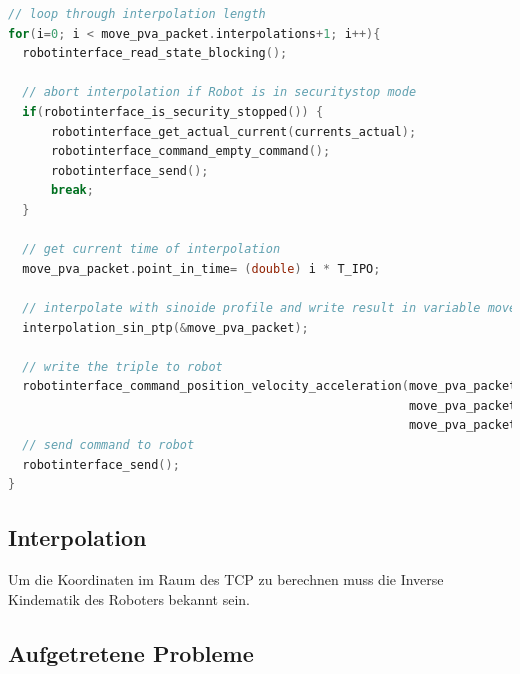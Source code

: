 \begin{lstlisting}[language=C,caption={Interpolation eines Berechneten Weges}, label=lst:interpolate,captionpos=b]
// loop through interpolation length  
for(i=0; i < move_pva_packet.interpolations+1; i++){
  robotinterface_read_state_blocking();

  // abort interpolation if Robot is in securitystop mode
  if(robotinterface_is_security_stopped()) {
      robotinterface_get_actual_current(currents_actual);
      robotinterface_command_empty_command();
      robotinterface_send();
      break;
  }

  // get current time of interpolation 
  move_pva_packet.point_in_time= (double) i * T_IPO;

  // interpolate with sinoide profile and write result in variable move_pva_packet
  interpolation_sin_ptp(&move_pva_packet);

  // write the triple to robot
  robotinterface_command_position_velocity_acceleration(move_pva_packet.pva.position,
                                                        move_pva_packet.pva.velocity,
                                                        move_pva_packet.pva.acceleration);
  // send command to robot
  robotinterface_send();
}
\end{lstlisting}

\subsection{Interpolation}
\label{sub:interpolation_rel}

Um die Koordinaten im Raum des \acs{TCP} zu berechnen muss die Inverse Kindematik des Roboters bekannt sein. 

\subsection{Aufgetretene Probleme}
\label{sub:capi-problems_rel}

